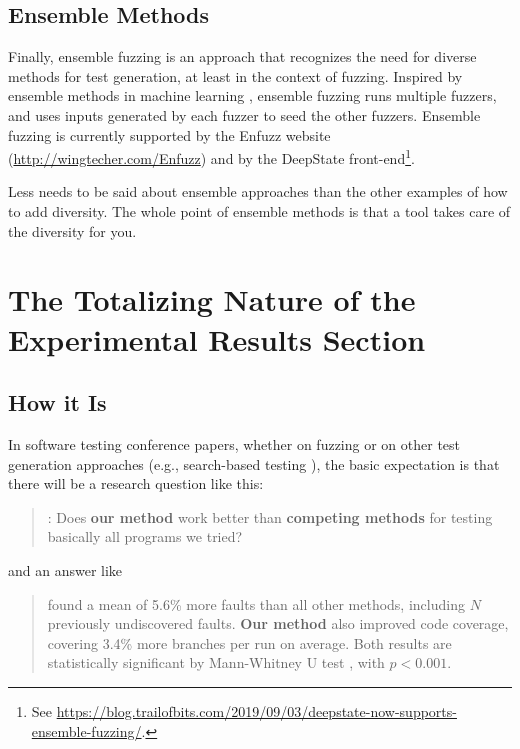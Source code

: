 \documentclass[sigplan,screen]{acmart}
\begin{document}
\subsection{Ensemble Methods}

Finally, ensemble fuzzing \cite{chen2019enfuzz} is an approach that recognizes the need for
diverse methods for test generation, at least in the context of
fuzzing.   Inspired by ensemble methods in machine learning \cite{dietterich2002ensemble},
ensemble fuzzing runs multiple fuzzers, and uses inputs generated by
each fuzzer to seed the other fuzzers.  Ensemble fuzzing is currently
supported by the Enfuzz website  (\url{http://wingtecher.com/Enfuzz})
and by the DeepState front-end\footnote{See
\url{https://blog.trailofbits.com/2019/09/03/deepstate-now-supports-ensemble-fuzzing/}.}.

Less needs to be said about ensemble approaches than the other
examples of how to add diversity.  The whole point of ensemble methods
is that a tool takes care of the diversity for you.

\section{The Totalizing Nature of the Experimental Results Section}

\subsection{How it Is}

In software testing conference papers, whether on fuzzing or on other test
generation approaches (e.g., search-based testing \cite{McMinn04search-basedsoftware}), the basic
expectation is that there will be a research question like this:

\begin{quote}
:  Does {\bf our method} work better than {\bf competing
  methods} for testing basically all programs we tried?
\end{quote}

\noindent and an answer like

\begin{quote}
 found a mean of 5.6\% more faults than all
other methods, including $N$ previously undiscovered faults.  {\bf Our
  method} also improved code coverage, covering 3.4\% more branches
per run on average.  Both results are statistically significant by
Mann-Whitney U test \cite{arcuri2014hitchhiker}, with $p < 0.001$.
\end{quote}
\end{document}
